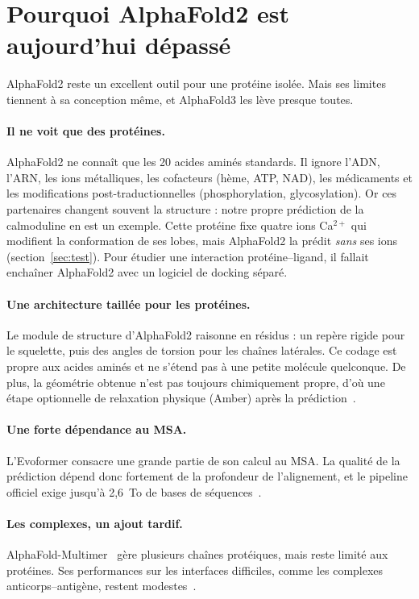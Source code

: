 \section{Pourquoi AlphaFold2 est aujourd'hui dépassé}

AlphaFold2 reste un excellent outil pour une protéine isolée. Mais ses limites tiennent à sa conception même, et AlphaFold3 les lève presque toutes.

\paragraph{Il ne voit que des protéines.} AlphaFold2 ne connaît que les 20 acides aminés standards. Il ignore l'ADN, l'ARN, les ions métalliques, les cofacteurs (hème, ATP, NAD), les médicaments et les modifications post-traductionnelles (phosphorylation, glycosylation). Or ces partenaires changent souvent la structure : notre propre prédiction de la calmoduline en est un exemple. Cette protéine fixe quatre ions Ca$^{2+}$ qui modifient la conformation de ses lobes, mais AlphaFold2 la prédit \emph{sans} ses ions (section~\ref{sec:test}). Pour étudier une interaction protéine--ligand, il fallait enchaîner AlphaFold2 avec un logiciel de docking séparé.

\paragraph{Une architecture taillée pour les protéines.} Le module de structure d'AlphaFold2 raisonne en \og résidus \fg{} : un repère rigide pour le squelette, puis des angles de torsion pour les chaînes latérales. Ce codage est propre aux acides aminés et ne s'étend pas à une petite molécule quelconque. De plus, la géométrie obtenue n'est pas toujours chimiquement propre, d'où une étape optionnelle de relaxation physique (Amber) après la prédiction~\cite{jumper2021}.

\paragraph{Une forte dépendance au MSA.} L'Evoformer consacre une grande partie de son calcul au MSA. La qualité de la prédiction dépend donc fortement de la profondeur de l'alignement, et le pipeline officiel exige jusqu'à 2,6~To de bases de séquences~\cite{alphafold_github}.

\paragraph{Les complexes, un ajout tardif.} AlphaFold-Multimer~\cite{evans2021} gère plusieurs chaînes protéiques, mais reste limité aux protéines. Ses performances sur les interfaces difficiles, comme les complexes anticorps--antigène, restent modestes~\cite{abramson2024}.

